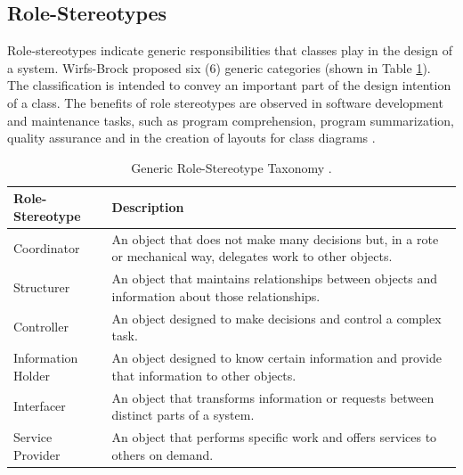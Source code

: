 \documentclass[AMA,Times1COL]{WileyNJDv5} %
\begin{document}
\subsection{Role-Stereotypes}
Role-stereotypes indicate generic responsibilities that classes play in the design of a system. Wirfs-Brock\cite{wirfs2006characterizing} proposed six (6) generic categories (shown in Table \ref{table:role-stereotype}). The classification is intended to convey an important part of the design intention of a class. The benefits of role stereotypes are observed in software development and maintenance tasks, such as program comprehension, program summarization, quality assurance and in the creation of layouts for class diagrams \cite{genero2008does, nurwidyantoro2019automated, sharif2009effect}.

\begin{table}[h]
	\centering %
	\caption{Generic Role-Stereotype Taxonomy \cite{wirfs2006characterizing, ho2022role}.} %
	\begin{tabular*}{\textwidth}{@{\extracolsep\fill}ll@{\extracolsep\fill}}%
		\toprule
		\textbf{Role-Stereotype} & \textbf{Description} \\ 
		\midrule
		Coordinator & An object that does not make many decisions but, in a rote or mechanical way, delegates work to other objects.\\ 
		Structurer & An object that maintains relationships between objects and information about those relationships. \\ 
		Controller & An object designed to make decisions and control a complex task.\\ 
			Information Holder  & An object designed to know certain information and provide that information to other objects. \\
		Interfacer & An object that transforms information or requests between distinct parts of a system. \\
		Service Provider & An object that performs specific work and offers services to others on demand.\\ 
		\bottomrule
	\end{tabular*}
	\label{table:role-stereotype} %
\end{table}
\end{document}

